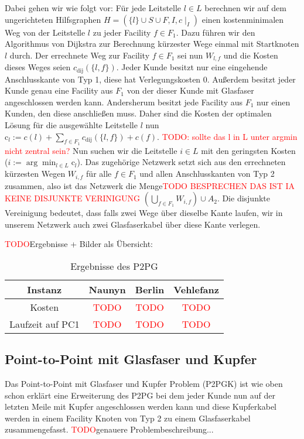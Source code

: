 \documentclass[11pt,a4paper]{article}
\newcommand{\TODO}{\textcolor{red}{TODO}}
\theoremstyle{my_th_style1}
\begin{document}
Dabei gehen wir wie folgt vor:
Für jede Leitstelle $ l \in L$ berechnen wir auf dem ungerichteten Hilfsgraphen $H=(\{l\} \cup S \cup F , I,c\mid_I)$ einen kostenminimalen Weg von der Leitstelle $l$ zu jeder Facility $f \in F_1$. Dazu führen wir den Algorithmus von Dijkstra zur Berechnung k\"urzester Wege einmal mit Startknoten $l$ durch.
Der errechnete Weg zur Facility \( f \in F_1\) sei nun $W_{l,f}$ und die Kosten dieses Weges seien $c_{\text{dij}}(\{l,f\})$. 
Jeder Kunde besitzt nur eine eingehende Anschlusskante von Typ 1, diese hat Verlegungskosten 0. 
Außerdem besitzt jeder Kunde genau eine Facility aus $F_1$ von der dieser Kunde mit Glasfaser angeschlossen werden kann. 
Andersherum besitzt jede Facility aus $F_1$ nur einen Kunden, den diese anschließen muss. 
Daher sind die Kosten der optimalen Lösung für die ausgewählte Leitstelle $l$ nun $\text{c}_l:=c(l) + \displaystyle\sum_{f \in F_1} c_{\text{dij}}(\{l,f\}) + c(f)$. 
\textcolor{red}{TODO: sollte das l in L unter argmin nicht zentral sein?}
Nun suchen wir die Leitstelle $i \in L$ mit den geringsten Kosten ($i:=\arg \displaystyle\min_{l \in L} \text{c}_l$). Das zugehörige Netzwerk setzt sich aus den errechneten kürzesten Wegen $W_{i,f}$ für alle $f \in F_1$ und allen Anschlusskanten von Typ 2 zusammen, also ist das Netzwerk die Menge\textcolor{red}{TODO BESPRECHEN DAS IST IA KEINE DISJUNKTE VERINIGUNG} $(\bigcup_{f \in F_1 }W_{i,f}) \cup A_2 $. Die disjunkte Vereinigung bedeutet, dass falls zwei Wege über dieselbe Kante laufen, wir in unserem Netzwerk auch zwei Glasfaserkabel über diese Kante verlegen.


\TODO Ergebnisse + Bilder als Übersicht:
\begin{table}[h]
	\centering
	\begin{tabular}{c|c|c|c}
		 Instanz & Naunyn & Berlin & Vehlefanz \\	
		\hline
		Kosten & \TODO & \TODO & \TODO\\
		Laufzeit auf PC1 & \TODO & \TODO & \TODO\\
	\end{tabular}
	\label{P2PG}
	\caption{Ergebnisse des P2PG} 
\end{table}
\vspace{2cm}


\subsection{Point-to-Point mit Glasfaser und Kupfer}
Das Point-to-Point mit Glasfaser und Kupfer Problem (P2PGK) ist wie oben schon erklärt eine Erweiterung des P2PG bei dem jeder Kunde nun auf der letzten Meile mit Kupfer angeschlossen werden kann und diese Kupferkabel werden in einem Facility Knoten von Typ 2 zu einem Glasfaserkabel zusammengefasst. \TODO genauere Problembeschreibung...
\end{document}
